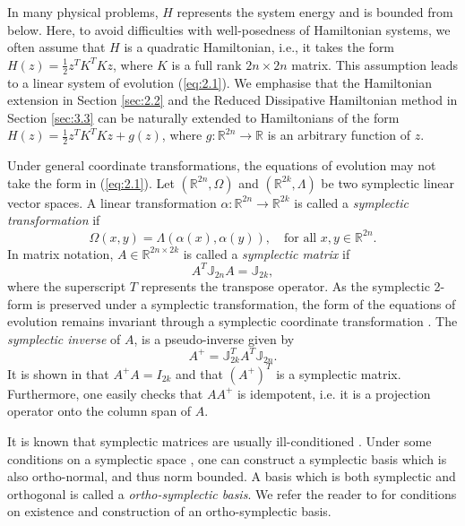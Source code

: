 In many physical problems, $H$ represents the system energy and is bounded from below. Here, to avoid difficulties with well-posedness of Hamiltonian systems,  we often assume that $H$ is a quadratic Hamiltonian, i.e., it takes the form $H(z) = \frac 1 2 z^T K^T K z$, where $K$ is a full rank $2n\times 2n$ matrix. This assumption leads to a linear system of evolution (\ref{eq:2.1}). We emphasise that the Hamiltonian extension in Section \ref{sec:2.2} and the Reduced Dissipative Hamiltonian method in Section \ref{sec:3.3} can be naturally extended to Hamiltonians of the form $H(z) = \frac 1 2 z^T K^T K z + g(z)$, where $g:\mathbb R^{2n} \to \mathbb R$ is an arbitrary function of $z$. 

Under general coordinate transformations, the equations of evolution may not take the form in (\ref{eq:2.1}). Let $(\mathbb R^{2n},\Omega)$ and $(\mathbb R^{2k},\Lambda)$ be two symplectic linear vector spaces. A linear transformation $\alpha :\mathbb R^{2n} \to \mathbb R^{2k}$ is called a \emph{symplectic transformation} \cite{Marsden:2010:IMS:1965128} if
\begin{equation}
	\Omega(x,y) = \Lambda(\alpha(x),\alpha(y)), \quad \text{for all } x,y\in \mathbb R^{2n}.
\end{equation}
In matrix notation, $A\in \mathbb R^{2n\times 2k}$ is called a \emph{symplectic matrix} if
\begin{equation}
	A^T \mathbb{J}_{2n} A = \mathbb{J}_{2k},
\end{equation}
where the superscript $T$ represents the transpose operator. As the symplectic 2-form is preserved under a symplectic transformation, the form of the equations of evolution remains invariant through a symplectic coordinate transformation \cite{Marsden:2010:IMS:1965128}. The \emph{symplectic inverse} of $A$, is a pseudo-inverse given by
\begin{equation}
	A^+ = \mathbb{\mathbb J}_{2k}^T A^T \mathbb J_{2n}.
\end{equation}
It is shown in \cite{Peng:2014di} that $A^+A = I_{2k}$ and that $(A^+)^T$ is a symplectic matrix. Furthermore, one easily checks that $AA^+$ is idempotent, i.e. it is a projection operator onto the column span of $A$. 

It is known that symplectic matrices are usually ill-conditioned \cite{Karow:2006cf}. Under some conditions on a symplectic space \cite{da2003introduction}, one can construct a symplectic basis which is also ortho-normal, and thus norm bounded. A basis which is both symplectic and orthogonal is called a \emph{ortho-symplectic basis}. We refer the reader to \cite{da2003introduction} for conditions on existence and construction of an ortho-symplectic basis.

